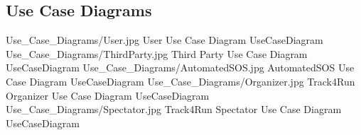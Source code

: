 \documentclass[../../../rasd.tex]{subfiles}
\begin{document}
\subsection{Use Case Diagrams}
\image {13cm} {Use_Case_Diagrams/User.jpg} {User Use Case Diagram} {UseCaseDiagram}
\image {13cm} {Use_Case_Diagrams/ThirdParty.jpg} {Third Party Use Case Diagram} {UseCaseDiagram}
\image {13cm} {Use_Case_Diagrams/AutomatedSOS.jpg} {AutomatedSOS Use Case Diagram} {UseCaseDiagram}
\image {13cm} {Use_Case_Diagrams/Organizer.jpg} {Track4Run Organizer Use Case Diagram} {UseCaseDiagram}
\image {13cm} {Use_Case_Diagrams/Spectator.jpg} {Track4Run Spectator Use Case Diagram} {UseCaseDiagram}
\end{document}
